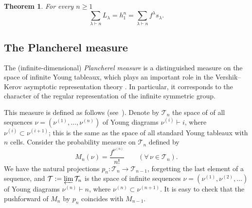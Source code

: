\documentclass[12pt]%
{amsart}
\DeclareMathOperator\Des{Des}
\newcommand{\la}{{\lambda}}
\newcommand{\Pl}{M_{\rm Planch}}
\theoremstyle{plain}
\newtheorem{theorem}{Theorem}[section]
\theoremstyle{definition}
\theoremstyle{remark}
\newcommand{\SYT}{{\operatorname{SYT}}}
\newcommand{\todo}[1]{\vspace{5 mm}\par \noindent
	\marginpar{\textsc{ToDo}} \framebox{\begin{minipage}[c]{0.95
				\textwidth}
			#1 \end{minipage}}\vspace{5 mm}\par}
\begin{document}
\begin{theorem}\label{t:sum_of_hLc}
    For every $n\ge 1$
    \[
        \sum_{\la \vdash n} L_\la 
        = h_1^n 
        = \sum_{\la\vdash n} f^\la s_\la .
    \]
\end{theorem}




\subsection{The Plancherel measure}\label{sec:Plancherel}

The (infinite-dimensional) {\em Plancherel measure} is a distinguished measure on the space of infinite Young tableaux, 
which plays an important role in the Vershik--Kerov asymptotic representation theory \cite{VershikKerovPlanch, VershikKerovChar}. In particular, it corresponds to the character of the regular representation of the infinite symmetric group. 

This measure is defined as follows (see~\cite{VershikKerovPlanch}). 
Denote by ${\mathcal T}_n$ the space of of all sequences 
$\nu=(\nu^{(1)},\ldots, \nu^{(n)})$ of Young diagrams $\nu^{(i)}\vdash i$, where $\nu^{(i)} \subset \nu^{(i+1)}$; this is the same as the space of all standard Young tableaux with $n$ cells.
Consider the probability measure on ${\mathcal T}_n$ defined by
\[
    M_n(\nu)
    = \frac{f^{\nu^{(n)}}}{n!} 
    \qquad (\forall\, \nu\in{\mathcal T}_n).
\]
We have the natural projections $p_n:{\mathcal T}_n\to{\mathcal T}_{n-1}$, forgetting the last element of a sequence, and ${\mathcal T}:=\varprojlim{\mathcal T}_n$ is the space of infinite sequences  $\nu =(\nu^{(1)},\nu^{(2)},\ldots)$ of Young diagrams $\nu^{(n)}\vdash n$, where $\nu^{(n)} \subset \nu^{(n+1)}$.
It is easy to check that the pushforward of $M_n$ by $p_n$ coincides with $M_{n-1}$.
\end{document}
